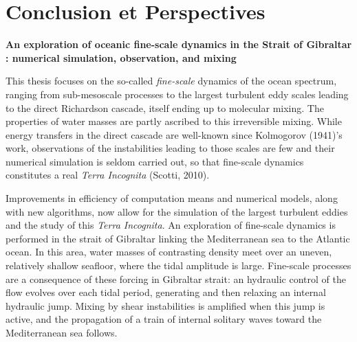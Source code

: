 \documentclass[a4paper,12pt,notitlepage,twoside]{report}
\numberwithin{equation}{section}
\begin{document}



\chapter{Conclusion et Perspectives}


\listoffigures

\listoftables





\newpage
\thispagestyle{empty}
\begin{center}
\textbf{An exploration of oceanic fine-scale dynamics in the Strait of Gibraltar : numerical simulation, observation, and mixing}
\end{center}
This thesis focuses on the so-called \textit{fine-scale} dynamics of the ocean spectrum, ranging from sub-mesoscale processes to the largest turbulent eddy scales leading to the direct Richardson cascade, itself ending up to molecular mixing. The properties of water masses are partly ascribed to this irreversible mixing. While energy transfers in the direct cascade are well-known since Kolmogorov (1941)'s work, observations of the instabilities leading to those scales are few and their numerical simulation is seldom carried out, so that fine-scale dynamics constitutes a real \textit{Terra Incognita} (Scotti, 2010).

Improvements in efficiency of computation means and numerical models, along with new algorithms, now allow for the simulation of the largest turbulent eddies and the study of this \textit{Terra Incognita}. An exploration of fine-scale dynamics is performed in the strait of Gibraltar linking the Mediterranean sea to the Atlantic ocean. In this area, water masses of contrasting density meet over an uneven, relatively shallow seafloor, where the tidal amplitude is large. Fine-scale processes are a consequence of these forcing in Gibraltar strait: an hydraulic control of the flow evolves over each tidal period, generating and then relaxing an internal hydraulic jump. Mixing by shear instabilities is amplified when this jump is active, and the propagation of a train of internal solitary waves toward the Mediterranean sea follows.
\end{document}
